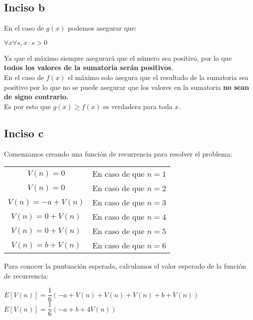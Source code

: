 \documentclass[11pt]{article}
\begin{document}
\subsection{Inciso b}
En el caso de $g(x)$ podemos asegurar que:
\begin{center}
$\forall x\forall s,x\cdot s >0$
\end{center}
Ya que el máximo siempre asegurará que el número sea positivo, por lo que \textbf{todos los valores de la sumatoria serán positivos}.\\
En el caso de $f(x)$ el máximo solo asegura que el resultado de la sumatoria sea positivo por lo que no se puede asegurar que los valores en la sumatoria \textbf{no sean de signo contrario.}\\
Es por esto que $g\left( x\right)\geq f\left( x\right)$ es verdadera para toda $x$.\\
\subsection{Inciso c}
Comenzamos creando una función de recurrencia para resolver el problema:\begin{center}
\begin{tabular}{ c c }
 $V(n) = 0$& En caso de que $n = 1$\\ 
 $V(n) = 0$& En caso de que $n = 2$\\  
 $V(n) = -a + V(n)$& En caso de que $n = 3$\\
 $V(n) = 0 + V(n)$& En caso de que $n = 4$\\
 $V(n) = 0 + V(n)$& En caso de que $n = 5$\\
 $V(n) = b + V(n)$& En caso de que $n = 6$\\
\end{tabular}
\end{center}
Para conocer la puntuación esperada, calculamos el valor esperado de la función de recurrencia:\begin{center}
$E[V(n)] = \dfrac{1}{6}\left( -a+V\left( n\right) +V\left( n\right) +V\left( n\right) +b+V\left( n\right) \right)$\\
$E[V(n)] = \dfrac{1}{6}( -a+b+4V(n) )$
\end{center}
\end{document}
